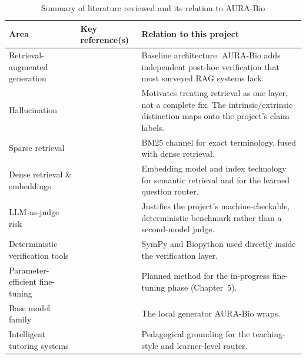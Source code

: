 \begin{table}[h]
\centering
\caption{Summary of literature reviewed and its relation to AURA-Bio}
\label{tab:2.1}
\footnotesize
\setlength{\tabcolsep}{4pt}
\renewcommand{\arraystretch}{1.2}
\begin{tabularx}{\textwidth}{@{}p{2.6cm} X X@{}}
\toprule
\textbf{Area} & \textbf{Key reference(s)} & \textbf{Relation to this project} \\
\midrule
Retrieval-augmented generation & \cite{lewis2020rag,gao2023ragsurvey} &
Baseline architecture. AURA-Bio adds independent post-hoc verification that
most surveyed RAG systems lack. \\
\addlinespace[3pt]
Hallucination & \cite{ji2023hallucination,shuster2021retrieval} &
Motivates treating retrieval as one layer, not a complete fix. The
intrinsic/extrinsic distinction maps onto the project's claim labels. \\
\addlinespace[3pt]
Sparse retrieval & \cite{robertson2009bm25} &
BM25 channel for exact terminology, fused with dense retrieval. \\
\addlinespace[3pt]
Dense retrieval \& embeddings & \cite{reimers2019sbert,xiao2023bge,liu2021sapbert,johnson2019faiss} &
Embedding model and index technology for semantic retrieval and for the
learned question router. \\
\addlinespace[3pt]
LLM-as-judge risk & \cite{zheng2023judging} &
Justifies the project's machine-checkable, deterministic benchmark rather
than a second-model judge. \\
\addlinespace[3pt]
Deterministic verification tools & \cite{meurer2017sympy,cock2009biopython} &
SymPy and Biopython used directly inside the verification layer. \\
\addlinespace[3pt]
Parameter-efficient fine-tuning & \cite{hu2021lora,dettmers2023qlora} &
Planned method for the in-progress fine-tuning phase (Chapter~5). \\
\addlinespace[3pt]
Base model family & \cite{qwen2023technical} &
The local generator AURA-Bio wraps. \\
\addlinespace[3pt]
Intelligent tutoring systems & \cite{vanlehn2011tutoring} &
Pedagogical grounding for the teaching-style and learner-level router. \\
\bottomrule
\end{tabularx}
\end{table}
